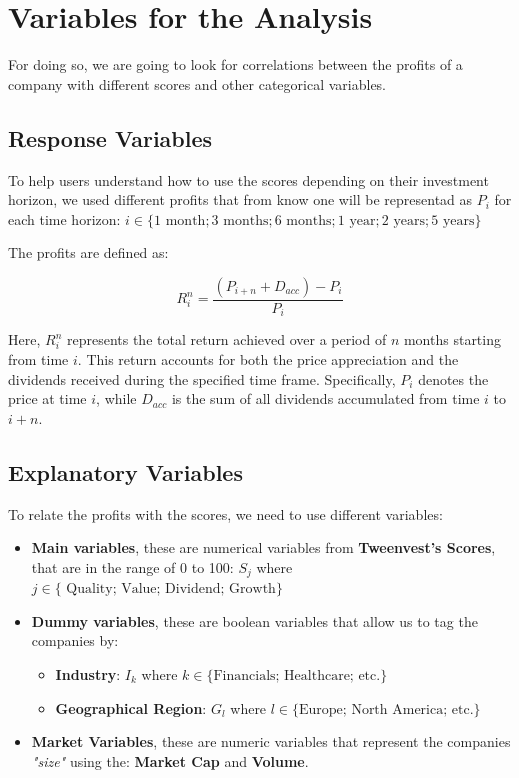 \documentclass[11pt,english,a4paper,hidelinks]{book}
\begin{document}
\section{Variables for the Analysis}

For doing so, we are going to look for correlations between the profits of a company with different scores and other categorical variables.

\subsection{Response Variables}
To help users understand how to use the scores depending on their investment horizon, we used different profits that from know one will be representad as \(P_i\) for each time horizon: \(i \in \{1 \text{ month}; 3 \text{ months}; 6 \text{ months}; 1 \text{ year}; 2 \text{ years}; 5 \text{ years}\}\)

\vspace{0.5cm}
\noindent The profits are defined as:

\begin{equation}
    R_i^n = \frac{(P_{i+n} + D_{acc}) - P_{i}}{P_{i}}
\end{equation}

\noindent Here, \(R_i^n\) represents the total return achieved over a period of \(n\) months starting from time \(i\). This return accounts for both the price appreciation and the dividends received during the specified time frame. Specifically, \(P_i\) denotes the price at time \(i\), while \(D_{acc}\) is the sum of all dividends accumulated from time \(i\) to \(i+n\).


\subsection{Explanatory Variables}
To relate the profits with the scores, we need to use different variables:
\begin{itemize}
    \item \textbf{Main variables}, these are numerical variables from \textbf{Tweenvest's Scores}, that are in the range of 0 to 100: \(S_j\) where   \(j \in \{\text{ Quality; Value; Dividend; Growth}\}\)
    \item \textbf{Dummy variables}, these are boolean variables that allow us to tag the companies by:
    \begin{itemize}
        \item \textbf{Industry}: \(I_k\) where \(k \in \{\text{Financials; Healthcare; etc.}\}\)
        \item \textbf{Geographical Region}: \(G_l\) where \(l \in \{\text{Europe; North America; etc.}\}\)
    \end{itemize}
    \item \textbf{Market Variables}, these are numeric variables that represent the companies \textit{"size"} using the: \textbf{Market Cap} and \textbf{Volume}.
\end{itemize}
\end{document}
